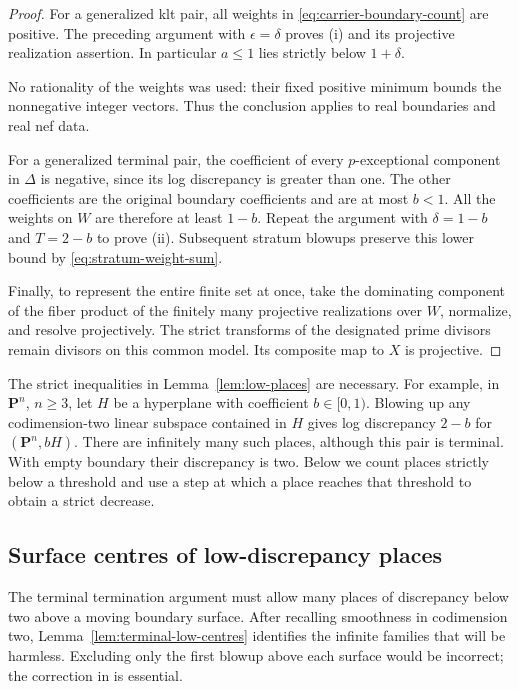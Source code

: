 \begin{proof}
For a generalized klt pair, all weights in
\eqref{eq:carrier-boundary-count} are positive.  The preceding
argument with $\epsilon=\delta$ proves \textup{(i)} and its projective
realization assertion.  In particular $a\leq1$ lies strictly below
$1+\delta$.

No rationality of the weights was used: their fixed positive minimum
bounds the nonnegative integer vectors.  Thus the conclusion applies
to real boundaries and real nef data.

For a generalized terminal pair, the coefficient of every
$p$-exceptional component in $\Delta$ is negative, since its
log discrepancy is greater than one.  The other coefficients are
the original boundary coefficients and are at most $b<1$.
All the weights on $W$ are therefore at least $1-b$.
Repeat the argument with $\delta=1-b$ and $T=2-b$ to prove
\textup{(ii)}.  Subsequent stratum blowups preserve this lower bound
by \eqref{eq:stratum-weight-sum}.

Finally, to represent the entire finite set at once, take the
dominating component of the fiber product of the finitely many
projective realizations over $W$, normalize, and resolve projectively.
The strict transforms of the designated prime divisors remain
divisors on this common model.  Its composite map to $X$ is projective.
\end{proof}

\begin{remark}\label{rem:strict-low-cutoff}
The strict inequalities in Lemma~\ref{lem:low-places} are necessary.
For example, in $\mathbf P^n$, $n\geq3$, let $H$ be a hyperplane
with coefficient $b\in[0,1)$.  Blowing up any codimension-two linear
subspace contained in $H$ gives log discrepancy $2-b$ for
$(\mathbf P^n,bH)$.  There are infinitely many such places, although
this pair is terminal.  With empty boundary their discrepancy is two.
Below we count places strictly below a threshold and use a step at
which a place reaches that threshold to obtain a strict decrease.
\end{remark}


\subsection{Surface centres of low-discrepancy places}

The terminal termination argument must allow many places of discrepancy
below two above a moving boundary surface.  After recalling smoothness in
codimension two, Lemma~\ref{lem:terminal-low-centres} identifies the infinite
families that will be harmless.  Excluding only
the first blowup above each surface would be incorrect; the correction
in \cite[Proposition~3.1 and Lemma~3.2]{Fujino2005Addendum} is essential.

